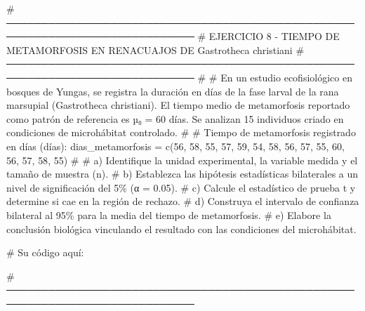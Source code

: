 \documentclass[
  spanish,
  letterpaper,
  DIV=11,
  numbers=noendperiod]{scrreprt}
\newenvironment{Shaded}{\begin{snugshade}}{\end{snugshade}}
\newcommand{\CommentTok}[1]{\textcolor[rgb]{0.37,0.37,0.37}{#1}}
\newcommand{\DecValTok}[1]{\textcolor[rgb]{0.68,0.00,0.00}{#1}}
\newcommand{\FunctionTok}[1]{\textcolor[rgb]{0.28,0.35,0.67}{#1}}
\newcommand{\NormalTok}[1]{\textcolor[rgb]{0.00,0.23,0.31}{#1}}
\newcommand{\OtherTok}[1]{\textcolor[rgb]{0.00,0.23,0.31}{#1}}
\begin{document}
\begin{Shaded}
\begin{Highlighting}[]
\CommentTok{\# ─────────────────────────────────────────────────────────────────────────────}
\CommentTok{\# EJERCICIO 8 {-} TIEMPO DE METAMORFOSIS EN RENACUAJOS DE Gastrotheca christiani}
\CommentTok{\# ─────────────────────────────────────────────────────────────────────────────}
\CommentTok{\#}
\CommentTok{\# En un estudio ecofisiológico en bosques de Yungas, se registra la duración en días de la fase larval de la rana marsupial (Gastrotheca christiani). El tiempo medio de metamorfosis reportado como patrón de referencia es µ₀ = 60 días. Se analizan 15 individuos criado en condiciones de microhábitat controlado.}
\CommentTok{\#}
\CommentTok{\# Tiempo de metamorfosis registrado en días (días):}
\NormalTok{dias\_metamorfosis }\OtherTok{=} \FunctionTok{c}\NormalTok{(}\DecValTok{56}\NormalTok{, }\DecValTok{58}\NormalTok{, }\DecValTok{55}\NormalTok{, }\DecValTok{57}\NormalTok{, }\DecValTok{59}\NormalTok{, }\DecValTok{54}\NormalTok{, }\DecValTok{58}\NormalTok{, }\DecValTok{56}\NormalTok{, }\DecValTok{57}\NormalTok{, }\DecValTok{55}\NormalTok{, }\DecValTok{60}\NormalTok{, }\DecValTok{56}\NormalTok{, }\DecValTok{57}\NormalTok{, }\DecValTok{58}\NormalTok{, }\DecValTok{55}\NormalTok{)}
\CommentTok{\#}
\CommentTok{\# a) Identifique la unidad experimental, la variable medida y el tamaño de muestra (n).}
\CommentTok{\# b) Establezca las hipótesis estadísticas bilaterales a un nivel de significación del 5\% (α = 0.05).}
\CommentTok{\# c) Calcule el estadístico de prueba t y determine si cae en la región de rechazo.}
\CommentTok{\# d) Construya el intervalo de confianza bilateral al 95\% para la media del tiempo de metamorfosis.}
\CommentTok{\# e) Elabore la conclusión biológica vinculando el resultado con las condiciones del microhábitat.}

\CommentTok{\# Su código aquí:}

\CommentTok{\# ─────────────────────────────────────────────────────────────────────────────}



\end{Highlighting}
\end{Shaded}
\end{document}
